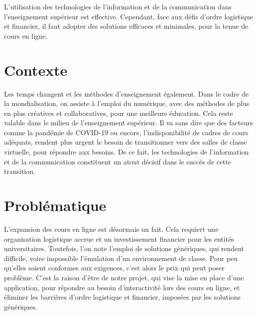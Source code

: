 
\introduction

\thispagestyle{plain} %

L'utilisation des technologies de l'information et de la communication dans l'enseignement supérieur
est effective. Cependant, face aux défis d'ordre logistique et financier, il faut adopter des
solutions efficaces et minimales, pour la tenue de cours en ligne.


\section*{Contexte}
Les temps changent et les méthodes d’enseignement également. 
Dans le cadre de la mondialisation, on assiste à l'emploi du numérique, 
avec des méthodes de plus en plus créatives et collaboratives, 
pour une meilleure éducation. Cela reste valable dans le milieu de l’enseignement supérieur.
Il va sans dire que des facteurs comme la pandémie de COVID-19 ou encore, 
l'indisponibilité de cadres de cours adéquats, 
rendent plus urgent le besoin de transitionner 
vers des salles de classe virtuelle, pour répondre aux besoins. 
De ce fait, les technologies de l’information et 
de la communication constituent un atout décisif dans le succès de cette transition.

\section*{Problématique}
L’expansion des cours en ligne est désormais un fait. 
Cela requiert une organisation logistique accrue et un investissement financier pour les entités universitaires. 
Toutefois, l’on note l’emploi de solutions génériques, qui rendent difficile, 
voire impossible l'émulation d’un environnement de classe. 
Pour peu qu’elles soient conformes aux exigences, c’est alors le prix qui peut poser problème. 
C’est la raison d'être de notre projet, qui vise la mise en place d’une application, 
pour répondre au besoin d'interactivité lors des cours en ligne, 
et éliminer les barrières d’ordre logistique et financier, imposées par les solutions génériques.

